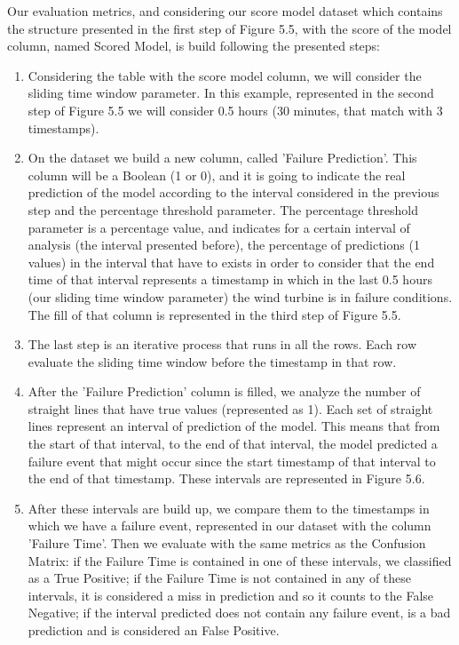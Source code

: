 Our evaluation metrics, and considering our score model dataset which contains the structure presented in the first step of Figure 5.5, with the score of the model column, named Scored Model, is build following the presented steps:
\begin{enumerate}
    \item
Considering the table with the score model column, we will consider the sliding time window parameter. In this example, represented in the second step of Figure 5.5 we will consider 0.5 hours (30 minutes, that match with 3 timestamps).
    \item
On the dataset we build a new column, called 'Failure Prediction'. This column will be a Boolean (1 or 0), and it is going to indicate the real prediction of the model according to the interval considered in the previous step and the percentage threshold parameter.
The percentage threshold parameter is a percentage value, and indicates for a certain interval of analysis (the interval presented before), the percentage of predictions (1 values) in the interval that have to exists in order to consider that the end time of that interval represents a timestamp in which in the last 0.5 hours (our sliding time window parameter) the wind turbine is in failure conditions. The fill of that column is represented in the third step of Figure 5.5.
    \item
The last step is an iterative process that runs in all the rows. Each row evaluate the sliding time window before the timestamp in that row.
    \item
After the 'Failure Prediction' column is filled, we analyze the number of straight lines that have true values (represented as 1). Each set of straight lines represent an interval of prediction of the model. This means that from the start of that interval, to the end of that interval, the model predicted a failure event that might occur since the start timestamp of that interval to the end of that timestamp. These intervals are represented in Figure 5.6.
    \item
After these intervals are build up, we compare them to the timestamps in which we have a failure event, represented in our dataset with the column 'Failure Time'.
Then we evaluate with the same metrics as the Confusion Matrix: if the Failure Time is contained in one of these intervals, we classified as a True Positive; if the Failure Time is not contained in any of these intervals, it is considered a miss in prediction and so it counts to the False Negative; if the interval predicted does not contain any failure event, is a bad prediction and is considered an False Positive.
\end{enumerate}

